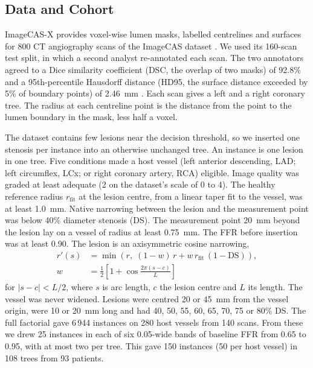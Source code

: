 \documentclass[journal]{IEEEtran}
\begin{document}
\subsection{Data and Cohort}
ImageCAS-X provides voxel-wise lumen masks, labelled centrelines and surfaces for 800 CT angiography scans of the
ImageCAS dataset \cite{zeng2023,bransby2026,imagecasx_data}. We used its 160-scan test split, in which a second
analyst re-annotated each scan. The two annotators agreed to a Dice similarity coefficient (DSC, the overlap of two
masks) of 92.8\% and a 95th-percentile Hausdorff distance (HD95, the surface distance exceeded by 5\% of boundary
points) of 2.46~mm \cite{bransby2026}. Each scan gives a left and a right coronary tree. The radius at each centreline point is the distance from the point to the
lumen boundary in the mask, less half a voxel.

The dataset contains few lesions near the decision threshold, so we inserted one stenosis per instance into an
otherwise unchanged tree. An instance is one lesion in one tree. Five conditions made a host vessel (left anterior
descending, LAD; left circumflex, LCx; or right coronary artery, RCA) eligible. Image quality was graded at least adequate (2 on the dataset's scale of 0 to 4). The healthy reference radius $r_\mathrm{fit}$ at the lesion centre, from a linear taper
fit to the vessel, was at least 1.0~mm. Native narrowing between the lesion and the measurement point was below
40\% diameter stenosis (DS). The measurement point 20~mm beyond the lesion lay on a vessel of radius at least
0.75~mm. The FFR before insertion was at least 0.90. The lesion is an axisymmetric cosine narrowing,
\begin{equation}
\begin{aligned}
r'(s) &= \min\!\left(r,\; (1-w)\,r + w\,r_\mathrm{fit}\,(1-\mathrm{DS})\right),\\
w &= \tfrac{1}{2}\left[1+\cos\tfrac{2\pi (s-c)}{L}\right]
\end{aligned}
\end{equation}
for $|s-c|<L/2$, where $s$ is arc length, $c$ the lesion centre and $L$ its length. The vessel was never widened.
Lesions were centred 20 or 45~mm from the vessel origin, were 10 or 20~mm long and had 40, 50, 55, 60, 65, 70, 75
or 80\% DS. The full factorial gave 6\,944 instances on 280 host vessels from 140 scans. From these we drew 25
instances in each of six 0.05-wide bands of baseline FFR from 0.65 to 0.95, with at most two per tree. This gave
150 instances (50 per host vessel) in 108 trees from 93 patients.
\end{document}
